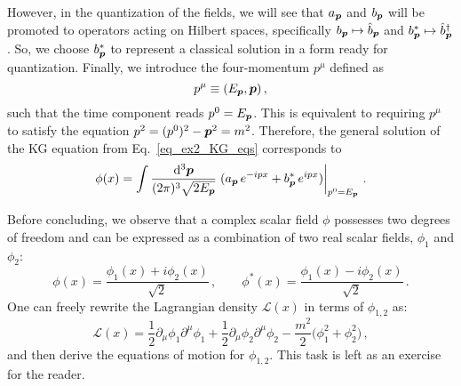 \begin{sol}
	However, in the quantization of the fields, we will see that $a_{\boldsymbol{p}}$ and $b_{\boldsymbol{p}}$ will be promoted to operators acting on Hilbert spaces, specifically $b_{\boldsymbol{p}} \mapsto \hat{b}_{\boldsymbol{p}}$ and $b_{\boldsymbol{p}}^* \mapsto \hat{b}^\dagger_{\boldsymbol{p}}$. 
	So, we choose $b_{\boldsymbol{p}}^*$ to represent a classical solution in a form ready for quantization.
	Finally, we introduce the four-momentum $p^\mu$ defined as
	\begin{equation}
		p^\mu \equiv (E_{\boldsymbol{p}}, \boldsymbol{p}) \,,
	\end{equation}
	such that the time component reads $p^0 = E_{\boldsymbol{p}}$. 
	This is equivalent to requiring $p^\mu$ to satisfy the equation $p^2 = (p^{0})^{2} - \boldsymbol{p}^2 = m^2$. 
	Therefore, the general solution of the KG equation from Eq.~\eqref{eq_ex2_KG_eqs} corresponds to
	\begin{equation}
		\phi(x) = \int \frac{\rmd^{3} \vp}{(2\pi)^{3} \sqrt{2 \Ep}} \eval{(a_{\vp} \, e^{- ipx} + b_{\vp}^* \, e^{ipx})}_{p^{0} = \Ep} \,.
	\end{equation}
	
	Before concluding, we observe that a complex scalar field $\phi$ possesses two degrees of freedom and can be expressed as a combination of two real scalar fields, $\phi_1$ and $\phi_2$:
	\begin{equation}
		\phi(x) = \frac{\phi_1(x) + i \phi_2(x)}{\sqrt{2}} \,,
		\qquad
		\phi^*(x) = \frac{\phi_1(x) - i \phi_2(x)}{\sqrt{2}} \,.
	\end{equation}
	One can freely rewrite the Lagrangian density $\mathcal{L}(x)$ in terms of $\phi_{1,2}$ as:
	\begin{equation}
		\mathcal{L}(x) = \frac{1}{2} \partial_\mu \phi_1 \partial^\mu \phi_1 + \frac{1}{2} \partial_\mu \phi_2 \partial^\mu \phi_2 - \frac{m^2}{2} \big(\phi_1^2 + \phi_2^2\big) \,,
	\end{equation}
	and then derive the equations of motion for $\phi_{1,2}$. This task is left as an exercise for the reader.
\end{sol}